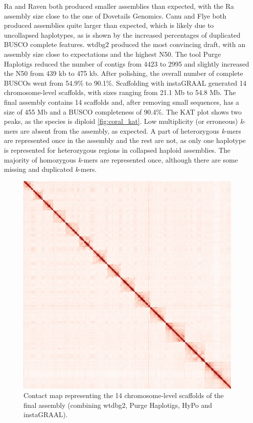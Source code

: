 Ra and Raven both produced smaller assemblies than expected, with the Ra assembly size close to the one of Dovetails Genomics. Canu and Flye both produced assemblies quite larger than expected, which is likely due to uncollapsed haplotypes, as is shown by the increased percentages of duplicated BUSCO complete features. wtdbg2 produced the most convincing draft, with an assembly size close to expectations and the highest N50. The tool Purge Haplotigs reduced the number of contigs from 4423 to 2995 and slightly increased the N50 from 439 kb to 475 kb. After polishing, the overall number of complete BUSCOs went from 54.9\% to 90.1\%. Scaffolding with instaGRAAL generated 14 chromosome-level scaffolds, with sizes ranging from 21.1 Mb to 54.8 Mb. The final assembly contains 14 scaffolds and, after removing small sequences, has a size of 455 Mb and a BUSCO completeness of 90.4\%. The KAT plot shows two peaks, as the species is diploid \ref{fig:coral_kat}. Low multiplicity (or erroneous) \textit{k}-mers are absent from the assembly, as expected. A part of heterozygous \textit{k}-mers are represented once in the assembly and the rest are not, as only one haplotype is represented for heterozygous regions in collapsed haploid assemblies. The majority of homozygous \textit{k}-mers are represented once, although there are some missing and duplicated \textit{k}-mers. 

\begin{figure}[H]
    \centering
    \includegraphics[width=0.9\linewidth]{fig/apoculata_contact_map_bin200.png}
    \caption{Contact map representing the 14 chromosome-level scaffolds of the final assembly (combining wtdbg2, Purge Haplotigs, HyPo and instaGRAAL).}
    \label{fig:coral_contact_map}
\end{figure}

